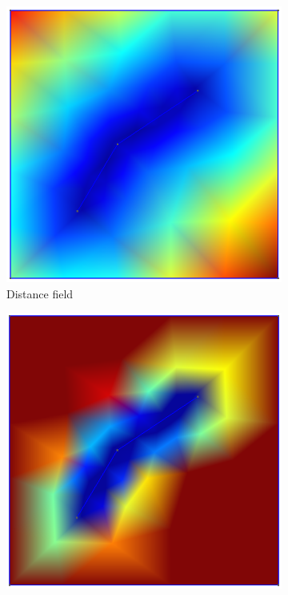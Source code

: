 \begin{figure}[ht]
    \centering
    \begin{subfigure}[b]{0.45\textwidth}
        \centering
        \includegraphics[width=\textwidth]{report/Images/Software/Gmsh fields/gmsh_field_distance.png}
        \caption{Distance field}
        \label{fig:gmsh-distance}
    \end{subfigure}
    \begin{subfigure}[b]{0.45\textwidth}
        \centering
        \includegraphics[width=\textwidth]{report/Images/Software/Gmsh fields/gmsh_field_threshold.png}

\end{subfigure}
\end{figure}
